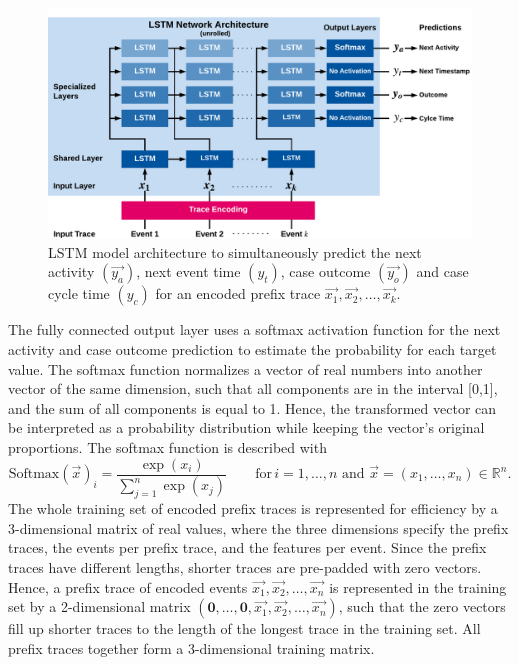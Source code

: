 \begin{figure}[!htbp]
	\centering
	\includegraphics[width=\textwidth]{figures/network}
	\caption[LSTM model architecture for text-aware process prediction]{LSTM model architecture to simultaneously predict the next activity $(\vec{y_a})$, next event time $(y_t)$, case outcome $(\vec{y_o})$ and case cycle time $(y_c)$ for an encoded prefix trace $\vec{x_1}, \vec{x_2}, \dots, \vec{x_k}$.}
	\label{fig:network}
\end{figure}

The fully connected output layer uses a softmax activation function for the next activity and case outcome prediction to estimate the probability for each target value.
The softmax function normalizes a vector of real numbers into another vector of the same dimension, such that all components are in the interval [0,1], and the sum of all components is equal to 1.
Hence, the transformed vector can be interpreted as a probability distribution while keeping the vector’s original proportions.
The softmax function is described with
\begin{equation*}\label{key}
	\text{Softmax}(\vec{x})_i = \frac{\exp(x_i)}{\sum_{j=1}^{n} \exp(x_j)}  \qquad \text{for} \, i = 1, \dots, n \text{ and } \vec{x}=(x_1, \dots, x_n) \in \mathbb{R}^n.
\end{equation*}
The whole training set of encoded prefix traces is represented for efficiency by a 3-dimensional matrix of real values, where the three dimensions specify the prefix traces, the events per prefix trace, and the features per event.
Since the prefix traces have different lengths, shorter traces are pre-padded \cite{DBLP:journals/corr/abs-1903-07288} with zero vectors.
Hence, a prefix trace of encoded events $\vec{x_1}, \vec{x_2}, \dots, \vec{x_n}$  is represented in the training set by a 2-dimensional matrix $(\mathbf{0}, \dots, \mathbf{0},\vec{x_1}, \vec{x_2}, \dots, \vec{x_n})$, such that the zero vectors fill up shorter traces to the length of the longest trace in the training set.
All prefix traces together form a 3-dimensional training matrix.

